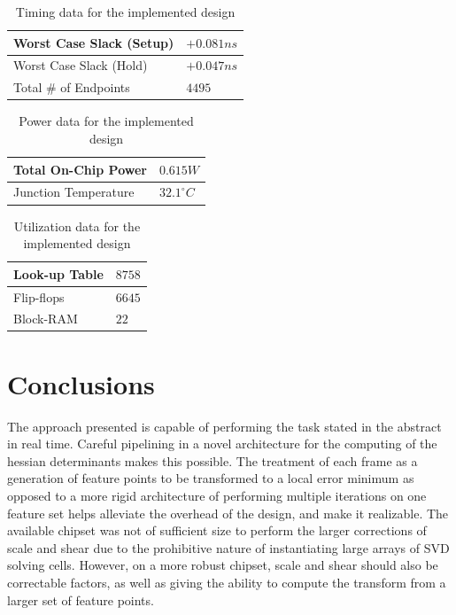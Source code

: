 \documentclass{article}
\begin{document}
\begin{table}[h]
	\centering
	\caption{Timing data for the implemented design}
	\begin{tabular}{l|l}
		Worst Case Slack (Setup) & $+0.081 ns$ \\
		\hline
		Worst Case Slack (Hold) & $+0.047 ns$ \\
		\hline
		Total \# of Endpoints & $4495$
	\end{tabular}
	\label{table_timing}
\end{table}

\begin{table}[h]
	\centering
	\caption{Power data for the implemented design}
	\begin{tabular}{l|l}
		Total On-Chip Power & $0.615 W$ \\
		\hline
		Junction Temperature & $32.1 ^{\circ} C$ 
	\end{tabular}
	\label{table_power}
\end{table}

\begin{table}[h]
	\centering
	\caption{Utilization data for the implemented design}
	\begin{tabular}{l|l}
		Look-up Table & $8758$ \\
		\hline
		Flip-flops & $6645$ \\
		\hline
		Block-RAM & $22$
	\end{tabular}
	\label{table_utilization}
\end{table}

\section{Conclusions}

The approach presented is capable of performing the task stated in the abstract in real time. Careful pipelining in a novel architecture for the computing of the hessian determinants makes this possible. The treatment of each frame as a generation of feature points to be transformed to a local error minimum as opposed to a more rigid architecture of performing multiple iterations on one feature set helps alleviate the overhead of the design, and make it realizable. The available chipset was not of sufficient size to perform the larger corrections of scale and shear due to the prohibitive nature of instantiating large arrays of SVD solving cells. However, on a more robust chipset, scale and shear should also be correctable factors, as well as giving the ability to compute the transform from a larger set of feature points.

\pagebreak
\clearpage

\singlespacing



\end{document}
